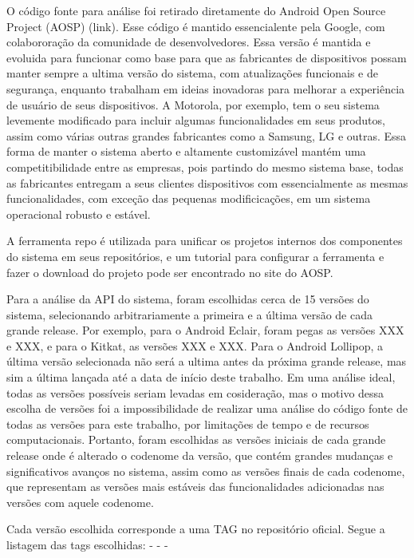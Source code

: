 O código fonte para análise foi retirado diretamente do Android Open Source Project (AOSP) (link). Esse código é mantido essencialente pela Google, com colabororação da comunidade de desenvolvedores. Essa versão é mantida e evoluida para funcionar como base para que as fabricantes de dispositivos possam manter sempre a ultima versão do sistema, com atualizações funcionais e de segurança, enquanto trabalham em ideias inovadoras para melhorar a experiência de usuário de seus dispositivos. A Motorola, por exemplo, tem o seu sistema levemente modificado para incluir algumas funcionalidades em seus produtos, assim como várias outras grandes fabricantes como a Samsung, LG e outras.  Essa forma de manter o sistema aberto e altamente customizável mantém uma competitibilidade entre as empresas, pois partindo do mesmo sistema base, todas as fabricantes entregam a seus clientes dispositivos com essencialmente as mesmas funcionalidades, com exceção das pequenas modificicações, em um sistema operacional robusto e estável.

 A ferramenta repo é utilizada para unificar os projetos internos dos componentes do sistema em seus repositórios, e um tutorial para configurar a ferramenta e fazer o download do projeto pode ser encontrado no site do AOSP.

Para a análise da API do sistema, foram escolhidas cerca de 15 versões do sistema, selecionando arbitrariamente a primeira e a última versão de cada grande release. Por exemplo, para o Android Eclair, foram pegas as versões XXX e XXX, e para o Kitkat, as versões XXX e XXX. Para o Android Lollipop, a última versão selecionada não será a ultima antes da próxima grande release, mas sim a última lançada até a data de início deste trabalho. Em uma análise ideal, todas as versões possíveis seriam levadas em cosideração, mas o motivo dessa escolha de versões foi a impossibilidade de realizar uma análise do código fonte de todas as versões para este trabalho, por limitações de tempo e de recursos computacionais. Portanto, foram escolhidas as versões iniciais de cada grande release onde é alterado o codenome da versão, que contém grandes mudanças e significativos avanços no sistema, assim como as versões finais de cada codenome, que representam as versões mais estáveis das funcionalidades adicionadas nas versões com aquele codenome.

 Cada versão escolhida corresponde a uma TAG no repositório oficial. Segue a listagem das tags escolhidas:
- 
-
-

